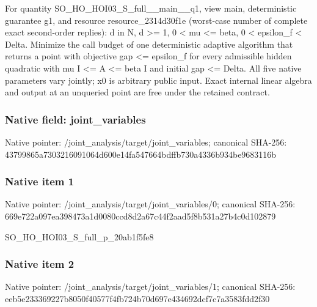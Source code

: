 \documentclass[10pt,a4paper]{article}
\begin{document}
\begingroup\raggedright\sloppy For quantity SO\_\allowbreak{}HO\_\allowbreak{}HOI03\_\allowbreak{}S\_\allowbreak{}full\_\allowbreak{}\_\allowbreak{}main\_\allowbreak{}\_\allowbreak{}q1,\allowbreak{} view main,\allowbreak{} deterministic guarantee g1,\allowbreak{} and resource resource\_\allowbreak{}2314d30f1e (worst-case number of complete exact second-order replies):\allowbreak{} d in N,\allowbreak{} d >=\allowbreak{} 1,\allowbreak{} 0 < mu <=\allowbreak{} beta,\allowbreak{} 0 < epsilon\_\allowbreak{}f < Delta. Minimize the call budget of one deterministic adaptive algorithm that returns a point with objective gap <=\allowbreak{} epsilon\_\allowbreak{}f for every admissible hidden quadratic with mu I <=\allowbreak{} A <=\allowbreak{} beta I and initial gap <=\allowbreak{} Delta. All five native parameters vary jointly;\allowbreak{} x0 is arbitrary public input. Exact internal linear algebra and output at an unqueried point are free under the retained contract.\par\endgroup

\subsubsection{Native field: joint\_\allowbreak{}variables}
Native pointer: /joint\_\allowbreak{}analysis/target/joint\_\allowbreak{}variables; canonical SHA-256: 43799865a7303216091064d600e14fa547664bdffb730a4336b934be9683116b

\subsubsection{Native item 1}
Native pointer: /joint\_\allowbreak{}analysis/target/joint\_\allowbreak{}variables/0; canonical SHA-256: 669e722a097ea398473a1d0080ccd8d2a67c44f2aad5f8b531a27b4c0d102879

\begingroup\raggedright\sloppy SO\_\allowbreak{}HO\_\allowbreak{}HOI03\_\allowbreak{}S\_\allowbreak{}full\_\allowbreak{}p\_\allowbreak{}20ab1f5fe8\par\endgroup

\subsubsection{Native item 2}
Native pointer: /joint\_\allowbreak{}analysis/target/joint\_\allowbreak{}variables/1; canonical SHA-256: eeb5e233369227b8050f40577f4fb724b70d697e434692dcf7c7a3583fdd2f30
\end{document}
